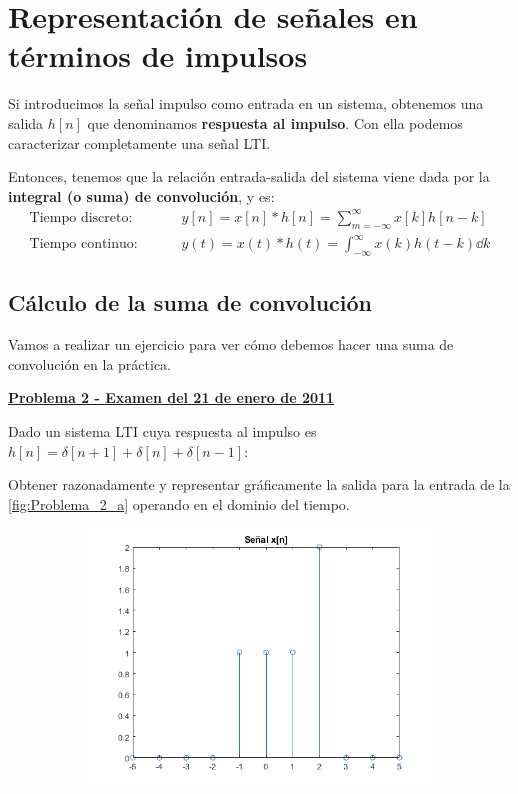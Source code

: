 \documentclass[a4paper]{book}
\begin{document}
\section{Representación de señales en términos de impulsos}
Si introducimos la señal impulso como entrada en un sistema, obtenemos una salida $h[n]$ que denominamos \textbf{respuesta al impulso}. Con ella podemos caracterizar completamente una señal LTI.

Entonces, tenemos que la relación entrada-salida del sistema viene dada por la \textbf{integral (o suma) de convolución}, y es:
\begin{align*}
	\text{Tiempo discreto: } & \qquad \boxed{y[n]=x[n]*h[n]=\sum^{\infty}_{m=-\infty}{x[k]h[n-k]}}    \\
	\text{Tiempo continuo: } & \qquad \boxed{y(t)=x(t)*h(t)=\int^{\infty}_{-\infty}{x(k)h(t-k)}\dd k}
\end{align*}

\subsection{Cálculo de la suma de convolución}
Vamos a realizar un ejercicio para ver cómo debemos hacer una suma de convolución en la práctica.
\vspace{\parskip}

\setlength{\leftskip}{0.5cm}
\setlength{\rightskip}{0.5cm}

\underline{\textbf{Problema 2 - Examen del 21 de enero de 2011}}

Dado un sistema LTI cuya respuesta al impulso es $h[n] = \delta [n+1] + \delta [n] + \delta [n-1]$:

Obtener razonadamente y representar gráficamente la salida para la entrada de la \autoref{fig:Problema_2_a} operando en el dominio del tiempo.

\begin{figure}[!ht]
	\caption{}
	\label{fig:Problema_2_a}
	\centering
	\begin{subfigure}[b]{0.75\linewidth}
		\includegraphics[width=\linewidth]{./Imágenes/aao.png}
	\end{subfigure}


\end{figure}
\end{document}
